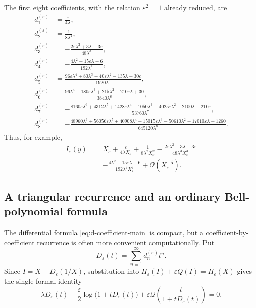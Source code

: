 \documentclass[11pt]{article}
\theoremstyle{definition}
\theoremstyle{remark}
\newcommand{\eps}{\varepsilon}
\newcommand{\lam}{\lambda}
\newcommand{\Qf}{\mathcal Q}
\newcommand{\bigO}{\mathcal O}
\begin{document}
The first eight coefficients, with the relation $\eps^2=1$ already reduced, are
\begin{align}
 d_1^{(\eps)}&=\frac{\eps}{4\lam},\label{eq:d1}\\
 d_2^{(\eps)}&=\frac{1}{8\lam^2},\label{eq:d2}\\
 d_3^{(\eps)}&=-\frac{2\eps\lam^2+3\lam-3\eps}{48\lam^3},\label{eq:d3}\\
 d_4^{(\eps)}&=-\frac{4\lam^2+15\eps\lam-6}{192\lam^4},\label{eq:d4}\\
 d_5^{(\eps)}&=\frac{96\eps\lam^4+80\lam^3+40\eps\lam^2-135\lam+30\eps}{1920\lam^5},\label{eq:d5}\\
 d_6^{(\eps)}&=\frac{96\lam^4+180\eps\lam^3+215\lam^2-210\eps\lam+30}{3840\lam^6},\label{eq:d6}\\
 d_7^{(\eps)}&=-\frac{8160\eps\lam^6+4312\lam^5+1428\eps\lam^4-1050\lam^3-4025\eps\lam^2+2100\lam-210\eps}{53760\lam^7},\label{eq:d7}\\
 d_8^{(\eps)}&=-\frac{48960\lam^6+56056\eps\lam^5+40908\lam^4+15015\eps\lam^3-50610\lam^2+17010\eps\lam-1260}{645120\lam^8}.
\label{eq:d8}
\end{align}
Thus, for example,
\begin{equation}\label{eq:inverse-first-terms}
\begin{split}
 I_\eps(y)={}&X_\eps
 +\frac{\eps}{4\lam X_\eps}
 +\frac{1}{8\lam^2X_\eps^2}
 -\frac{2\eps\lam^2+3\lam-3\eps}{48\lam^3X_\eps^3}\\
 &-\frac{4\lam^2+15\eps\lam-6}{192\lam^4X_\eps^4}
 +\bigO(X_\eps^{-5}).
\end{split}
\end{equation}

\subsection{A triangular recurrence and an ordinary Bell-polynomial formula}

The differential formula \eqref{eq:d-coefficient-main} is compact, but a coefficient-by-coefficient recurrence is often more convenient computationally.  Put
\begin{equation}\label{eq:Dseries}
 D_\eps(t)=\sum_{n=1}^\infty d_n^{(\eps)}t^n.
\end{equation}
Since $I=X+D_\eps(1/X)$, substitution into
$H_\eps(I)+\eps Q(I)=H_\eps(X)$ gives the single formal identity
\begin{equation}\label{eq:D-functional}
 \lam D_\eps(t)-\frac\eps2\log\bigl(1+tD_\eps(t)\bigr)
 +\eps\Qf\!\left(\frac{t}{1+tD_\eps(t)}\right)=0.
\end{equation}
\end{document}

